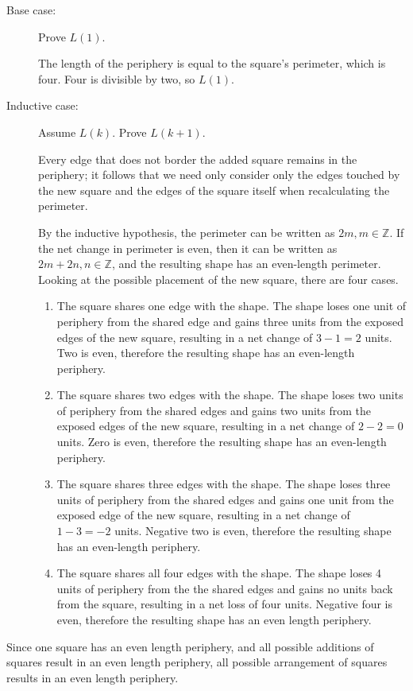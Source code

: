 \documentclass[11pt]{article}
\begin{document}
	\begin{description}
	
		\item[Base case:] Prove $L(1)$.
		
		
			The length of the periphery is equal to the square's perimeter, 
			which is four. Four is divisible by two, so $L(1)$.
	
		\item[Inductive case:] Assume $L(k)$. Prove $L(k+1)$.
		
		
			Every edge that does not border the added square remains in
			the periphery; it follows that we need only consider only 
			the edges touched by the new square and the edges of the 
			square itself when recalculating the perimeter. 
			
			By the inductive hypothesis, the perimeter can be written as $2m, 
			m \in \mathbb{Z}$. If the net change in perimeter is even, then it 
			can be 
			written as $2m + 2n, n \in \mathbb{Z}$, and the 
			resulting shape has an even-length perimeter. Looking at 
			the possible	 placement of the new square, there are four 
			cases.
		
			\begin{enumerate}[{Case } 1:]
				\item The square shares one edge with the shape. The shape 
				loses one unit of periphery from the shared edge and gains 
				three units from the exposed edges of the new square, 
				resulting in a net change of $3-1 = 2$ units. Two is even, 
				therefore the resulting shape has an even-length periphery.
				
				\item The square shares two edges with the shape. The shape 
				loses two units of periphery from the shared edges and gains 
				two units from the exposed edges of the new square, resulting 
				in a net change of $2-2 = 0$ units. Zero is even, therefore 
				the resulting shape has an even-length periphery.
				
				\item The square shares three edges with the shape. The shape 
				loses three units of periphery from the shared edges and gains 
				one unit from the exposed edge of the new square, resulting in 
				a net change of $1-3 = -2$ units. Negative two is even, 
				therefore the resulting shape has an even-length periphery.
				
				\item The square shares all four edges with the shape. The 
				shape loses 4 units of periphery from the the shared edges and 
				gains no units back from the square, resulting in a net loss 
				of four units. Negative four is even, therefore the resulting 
				shape has an even length periphery.
			
			\end{enumerate}
	\end{description}					
				Since one square has an even length periphery, and all 
				possible additions of squares result in an even length 
				periphery, all possible arrangement of squares results in an 
				even length periphery.
			
\end{document}
